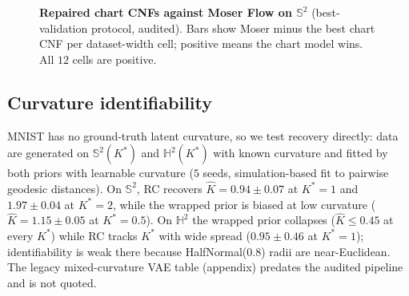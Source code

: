 \documentclass{article}
\theoremstyle{definition}
\theoremstyle{remark}
\newcommand{\SSS}{\mathbb{S}}
\newcommand{\HH}{\mathbb{H}}
\begin{document}
\begin{figure}[t]
\centering
{}
\caption{\textbf{Repaired chart CNFs against Moser Flow on $\SSS^2$} (best-validation protocol, audited). Bars show Moser minus the best chart CNF per dataset-width cell; positive means the chart model wins. All $12$ cells are positive.}
\label{fig:q5_margins}
\end{figure}

\subsection{Curvature identifiability}
\label{sec:exp_curvature}
MNIST has no ground-truth latent curvature, so we test recovery directly: data are generated on $\SSS^2(K^*)$ and $\HH^2(K^*)$ with known curvature and fitted by both priors with learnable curvature ($5$ seeds, simulation-based fit to pairwise geodesic distances). On $\SSS^2$, RC recovers $\hat K = 0.94 \pm 0.07$ at $K^*{=}1$ and $1.97 \pm 0.04$ at $K^*{=}2$, while the wrapped prior is biased at low curvature ($\hat K = 1.15 \pm 0.05$ at $K^*{=}0.5$). On $\HH^2$ the wrapped prior collapses ($\hat K \le 0.45$ at every $K^*$) while RC tracks $K^*$ with wide spread ($0.95 \pm 0.46$ at $K^*{=}1$); identifiability is weak there because HalfNormal($0.8$) radii are near-Euclidean. The legacy mixed-curvature VAE table (appendix) predates the audited pipeline and is not quoted.
\end{document}
